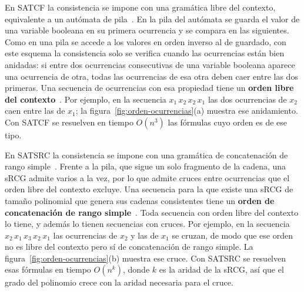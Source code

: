 En SATCF la consistencia se impone con una gramática libre del contexto,
equivalente a un autómata de pila~\cite{fernandezarias2007}. En la pila
del autómata se guarda el valor de una variable booleana en su primera
ocurrencia y se compara en las siguientes. Como en una pila se accede a los valores en orden inverso al
de guardado, con este esquema la consistencia solo se verifica cuando
las ocurrencias están bien anidadas: si entre dos ocurrencias
consecutivas de una variable booleana aparece una ocurrencia de otra, todas las
ocurrencias de esa otra deben caer entre las dos primeras. Una secuencia
de ocurrencias con esa propiedad tiene un \textbf{orden libre del
contexto}~\cite{fernandezarias2007}. Por ejemplo, en la secuencia
$x_1\,x_2\,x_2\,x_1$ las dos ocurrencias de $x_2$ caen entre las de
$x_1$; la figura~\ref{fig:orden-ocurrencias}(a) muestra ese anidamiento.
Con SATCF se resuelven en tiempo $O(n^3)$ las fórmulas cuyo orden es de
ese tipo.

En SATSRC la consistencia se impone con una gramática de concatenación
de rango simple~\cite{aguileralopez2016}. Frente a la pila, que sigue un
solo fragmento de la cadena, una sRCG admite varios a la vez, por lo que
admite cruces entre ocurrencias que el orden libre del contexto excluye.
Una secuencia para la que existe una sRCG de tamaño polinomial que
genera sus cadenas consistentes tiene un \textbf{orden de concatenación
de rango simple}~\cite{aguileralopez2016}. Toda secuencia con orden
libre del contexto lo tiene, y además lo tienen secuencias con cruces.
Por ejemplo, en la secuencia $x_2\,x_1\,x_3\,x_2\,x_1$ las ocurrencias de
$x_2$ y las de $x_1$ se cruzan, de modo que ese orden no es libre del
contexto pero sí de concatenación de rango simple. La
figura~\ref{fig:orden-ocurrencias}(b) muestra ese cruce.
Con SATSRC se resuelven esas fórmulas en tiempo $O(n^k)$, donde $k$ es la
aridad de la sRCG, así que el grado del polinomio crece con la aridad
necesaria para el cruce.

